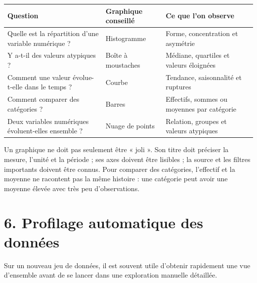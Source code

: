 \documentclass[
  french,
  letterpaper,
  open=any]{scrbook}
\newcounter{none} %
\theoremstyle{definition}
\theoremstyle{definition}
\theoremstyle{remark}
\begin{document}
{\def\LTcaptype{none} %
\begin{longtable}[]{@{}
  >{\raggedright\arraybackslash}p{}
  >{\raggedright\arraybackslash}p{}
  >{\raggedright\arraybackslash}p{}@{}}
\toprule\noalign{}
\begin{minipage}[b]{\linewidth}\raggedright
Question
\end{minipage} & \begin{minipage}[b]{\linewidth}\raggedright
Graphique conseillé
\end{minipage} & \begin{minipage}[b]{\linewidth}\raggedright
Ce que l'on observe
\end{minipage} \\
\midrule\noalign{}
\endhead
\bottomrule\noalign{}
\endlastfoot
Quelle est la répartition d'une variable numérique ? & Histogramme &
Forme, concentration et asymétrie \\
Y a-t-il des valeurs atypiques ? & Boîte à moustaches & Médiane,
quartiles et valeurs éloignées \\
Comment une valeur évolue-t-elle dans le temps ? & Courbe & Tendance,
saisonnalité et ruptures \\
Comment comparer des catégories ? & Barres & Effectifs, sommes ou
moyennes par catégorie \\
Deux variables numériques évoluent-elles ensemble ? & Nuage de points &
Relation, groupes et valeurs atypiques \\
\end{longtable}
}

Un graphique ne doit pas seulement être « joli ». Son titre doit
préciser la mesure, l'unité et la période ; ses axes doivent être
lisibles ; la source et les filtres importants doivent être connus. Pour
comparer des catégories, l'effectif et la moyenne ne racontent pas la
même histoire : une catégorie peut avoir une moyenne élevée avec très
peu d'observations.

\section{6. Profilage automatique des
données}\label{profilage-automatique-des-donnuxe9es}

Sur un nouveau jeu de données, il est souvent utile d'obtenir rapidement
une vue d'ensemble avant de se lancer dans une exploration manuelle
détaillée.
\end{document}

